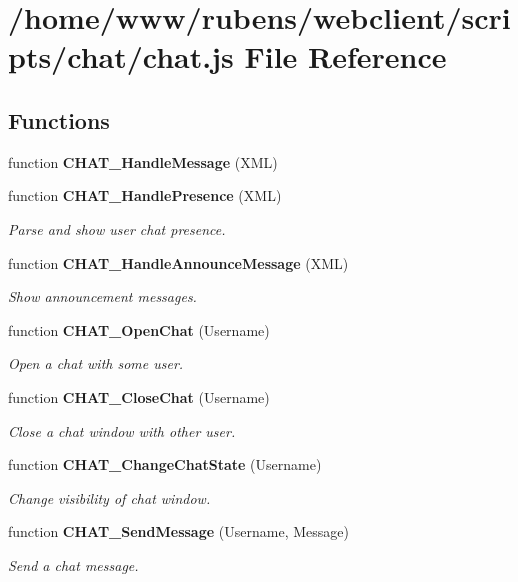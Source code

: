 \section{/home/www/rubens/webclient/scripts/chat/chat.js File Reference}
\label{chat_2chat_8js}
\subsection*{Functions}
\begin{CompactItemize}
\item 
function {\bf CHAT\_\-HandleMessage} (XML)
\item 
function {\bf CHAT\_\-HandlePresence} (XML)
\begin{CompactList}\small\item\em Parse and show user chat presence. \item\end{CompactList}\item 
function {\bf CHAT\_\-HandleAnnounceMessage} (XML)
\begin{CompactList}\small\item\em Show announcement messages. \item\end{CompactList}\item 
function {\bf CHAT\_\-OpenChat} (Username)
\begin{CompactList}\small\item\em Open a chat with some user. \item\end{CompactList}\item 
function {\bf CHAT\_\-CloseChat} (Username)
\begin{CompactList}\small\item\em Close a chat window with other user. \item\end{CompactList}\item 
function {\bf CHAT\_\-ChangeChatState} (Username)
\begin{CompactList}\small\item\em Change visibility of chat window. \item\end{CompactList}\item 
function {\bf CHAT\_\-SendMessage} (Username, Message)
\begin{CompactList}\small\item\em Send a chat message. \item\end{CompactList}\item 

\end{CompactItemize}
